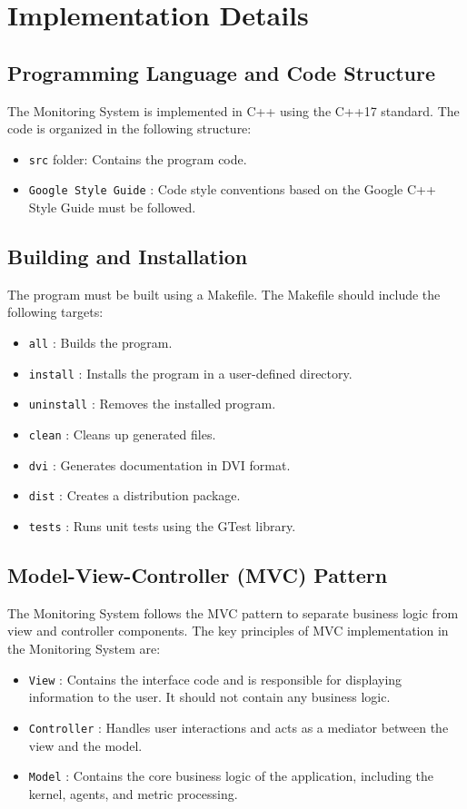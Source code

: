 \documentclass[12pt, letterpaper]{article}
\begin{document}
\section{Implementation Details}

\subsection{Programming Language and Code Structure}
The Monitoring System is implemented in C++ using the C++17 standard. The code is organized in the following structure:
\begin{itemize}
    \item \texttt{src} folder: Contains the program code.
    \item \texttt{Google Style Guide} : Code style conventions based on the Google C++ Style Guide must be followed.
\end{itemize}

\subsection{Building and Installation}
The program must be built using a Makefile. The Makefile should include the following targets:
\begin{itemize}
    \item \texttt{all} : Builds the program.
    \item \texttt{install} : Installs the program in a user-defined directory.
    \item \texttt{uninstall} : Removes the installed program.
    \item \texttt{clean} : Cleans up generated files.
    \item \texttt{dvi} : Generates documentation in DVI format.
    \item \texttt{dist} : Creates a distribution package.
    \item \texttt{tests} : Runs unit tests using the GTest library.
\end{itemize}

\subsection{Model-View-Controller (MVC) Pattern}
The Monitoring System follows the MVC pattern to separate business logic from view and controller components. The key principles of MVC implementation in the Monitoring System are:
\begin{itemize}
    \item \texttt{View} : Contains the interface code and is responsible for displaying information to the user. It should not contain any business logic.
    \item \texttt{Controller} : Handles user interactions and acts as a mediator between the view and the model.
    \item \texttt{Model} : Contains the core business logic of the application, including the kernel, agents, and metric processing.
\end{itemize}
\end{document}
